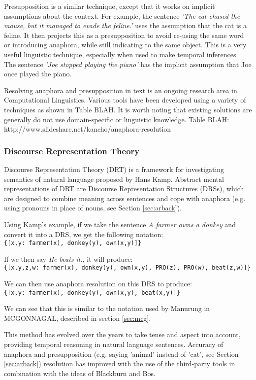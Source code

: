Presupposition is a similar technique, except that it works on implicit assumptions about the context. For example, the sentence \textit{'The cat chased the mouse, but it managed to evade the feline.'} uses the assumption that the cat is a feline. It then projects this as a presupposition to avoid re-using the same word or introducing anaphora, while still indicating to the same object. This is a very useful linguistic technique, especially when used to make temporal inferences. The sentence \textit{'Joe stopped playing the piano'} has the implicit assumption that Joe once played the piano.

Resolving anaphora and presupposition in text is an ongoing research area in Computational Linguistics. Various tools have been developed using a variety of techniques as shown in Table BLAH. It is worth noting that existing solutions are generally do not use domain-specific or linguistic knowledge.
Table BLAH: http://www.slideshare.net/kancho/anaphora-resolution

\subsubsection{Discourse Representation Theory}
\label{sec:drt}
Discourse Representation Theory (DRT)\cite{kamp1993discourse} is a framework for investigating semantics of natural language proposed by Hans Kamp. Abstract mental representations of DRT are Discourse Representation Structures (DRSs), which are designed to combine meaning across sentences and cope with anaphora (e.g. using pronouns in place of nouns, see Section \ref{sec:arback}). 

Using Kamp's example, if we take the sentence \textit{A farmer owns a donkey} and convert it into a DRS, we get the following notation:\\
\texttt{\{[x,y: farmer(x), donkey(y), own(x,y)]\}}

If we then say \textit{He beats it.}, it will produce:\\
\texttt{\{[x,y,z,w: farmer(x), donkey(y), own(x,y), PRO(z), PRO(w), beat(z,w)]\}}

We can then use anaphora resolution on this DRS to produce:\\
\texttt{\{[x,y: farmer(x), donkey(y), own(x,y), beat(x,y)]\}}

We can see that this is similar to the notation used by Manurung in MCGONNAGAL, described in section \ref{sec:mcg}.

This method has evolved over the years to take tense and aspect into account, providing temporal reasoning in natural language sentences. Accuracy of anaphora and presupposition (e.g. saying 'animal' instead of 'cat', see Section \ref{sec:arback}) resolution has improved with the use of the third-party tools in combination with the ideas of Blackburn and Bos\cite{blackburn2008computational}.

